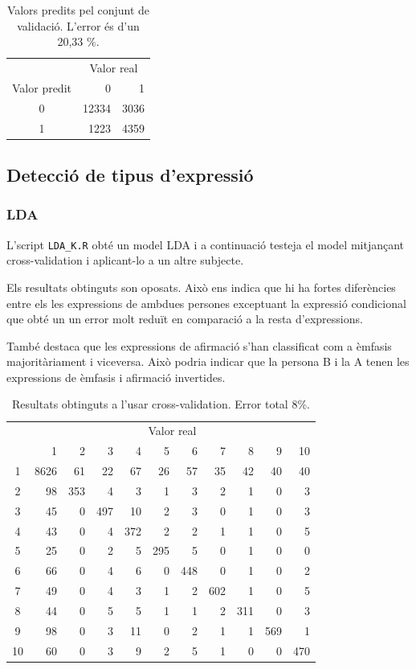 \documentclass[a4paper]{article}
\begin{document}
\begin{table}[H]
	\centering
	\def\arraystretch{1.5}
	\begin{tabular}{c|rr}
		& \multicolumn{2}{c}{Valor real} \\
		Valor predit & 0 & 1 \\
		\hline
		0 & 12334 & 3036 \\
		1 &  1223 & 4359 \\
	\end{tabular}
	\caption{Valors predits pel conjunt de validació. L'error és d'un 20,33 \%.}
	\label{tab:lda_yes_no4}
\end{table}

\subsection{Detecció de tipus d'expressió}
\subsubsection{LDA}

L’script \verb|LDA_K.R|  obté un model LDA i a continuació testeja el model mitjançant cross-validation i aplicant-lo a un altre subjecte.

Els resultats obtinguts son oposats. Això ens indica que hi ha fortes diferències entre els les expressions de ambdues persones exceptuant la expressió condicional que obté un un error molt reduït en comparació a la resta d’expressions.

També destaca que les expressions de afirmació s’han classificat com a èmfasis majoritàriament i viceversa. Això podria indicar que la persona B i la A tenen les expressions de èmfasis i afirmació invertides.

\begin{table}[H]
	\centering
	\begin{tabular}{c|rrrrrrrrrr}
		& \multicolumn{10}{c}{Valor real} \\
		 & 1 & 2 & 3 & 4 & 5 & 6 & 7 & 8 & 9 & 10 \\
		 \hline
		1 & 8626 & 61 & 22 & 67 & 26 & 57 & 35 & 42 & 40 & 40 \\
		2 & 98 & 353 & 4 & 3 & 1 & 3 & 2 & 1 & 0 & 3 \\
		3 & 45 & 0 & 497 & 10 & 2 & 3 & 0 & 1 & 0 & 3 \\
		4 & 43 & 0 & 4 & 372 & 2 & 2 & 1 & 1 & 0 & 5 \\
		5 & 25 & 0 & 2 & 5 & 295 & 5 & 0 & 1 & 0 & 0 \\
		6 & 66 & 0 & 4 & 6 & 0 & 448 & 0 & 1 & 0 & 2 \\
		7 & 49 & 0 & 4 & 3 & 1 & 2 & 602 & 1 & 0 & 5 \\
		8 & 44 & 0 & 5 & 5 & 1 & 1 & 2 & 311 & 0 & 3 \\
		9 & 98 & 0 & 3 & 11 & 0 & 2 & 1 & 1 & 569 & 1 \\
		10 & 60 & 0 & 3 & 9 & 2 & 5 & 1 & 0 & 0 & 470 \\
	\end{tabular}
	\caption{Resultats obtinguts a l'usar cross-validation. Error total 8\%.}
\end{table}
\end{document}
